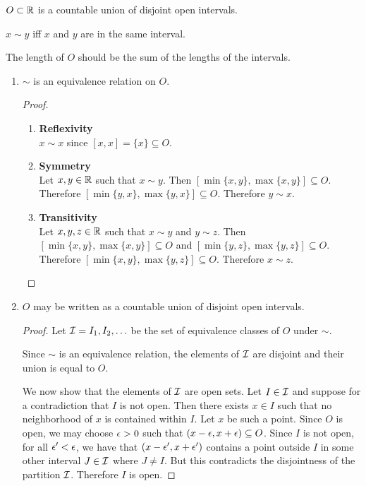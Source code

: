 \begin{intuition*}
  $O \subset \mathbb{R}$ is a countable union of disjoint open intervals.

  $x \sim y$ iff $x$ and $y$ are in the same interval.

  The length of $O$ should be the sum of the lengths of the intervals.
\end{intuition*}


\begin{enumerate}[label=(1.\arabic*)]
\item
  \begin{claim*}
    $\sim$ is an equivalence relation on $O$.
  \end{claim*}
  \begin{proof}
    \begin{enumerate}
    \item {\bf Reflexivity}\\
      $x \sim x$ since $[x, x] = \{x\} \subseteq O$.

    \item {\bf Symmetry}\\
      Let $x, y \in \mathbb{R}$ such that $x \sim y$. Then $[\min\{x, y\}, \max\{x, y\}] \subseteq O$.
      Therefore $[\min\{y, x\}, \max\{y, x\}] \subseteq O$. Therefore $y \sim x$.

    \item {\bf Transitivity}\\
      Let $x, y, z \in \mathbb{R}$ such that $x \sim y$ and $y \sim z$. Then $[\min\{x, y\}, \max\{x, y\}] \subseteq O$
      and $[\min\{y, z\}, \max\{y, z\}] \subseteq O$. Therefore $[\min\{x, y\}, \max\{y, z\}] \subseteq O$.
      Therefore $x \sim z$.
    \end{enumerate}
  \end{proof}

\item
  \begin{claim*}
    $O$ may be written as a countable union of disjoint open intervals.
  \end{claim*}

  \begin{proof}
    Let $\mathcal I = I_1, I_2, \ldots$ be the set of equivalence classes of $O$ under $\sim$.

    Since $\sim$ is an equivalence relation, the elements of $\mathcal I$ are disjoint and their union is equal
    to $O$.

    We now show that the elements of $\mathcal I$ are open sets. Let $I \in \mathcal I$ and suppose for a contradiction
    that $I$ is not open. Then there exists $x \in I$ such that no neighborhood of $x$ is contained within $I$.
    Let $x$ be such a point. Since $O$ is open, we may choose $\epsilon > 0$ such
    that $(x-\epsilon, x+\epsilon) \subseteq O$. Since $I$ is not open, for all $\epsilon' < \epsilon$, we have
    that $(x-\epsilon', x+\epsilon')$ contains a point outside $I$ in some other interval $J \in \mathcal I$
    where $J \neq I$. But this contradicts the disjointness of the partition $\mathcal I$. Therefore $I$ is open.


\end{proof}
\end{enumerate}
